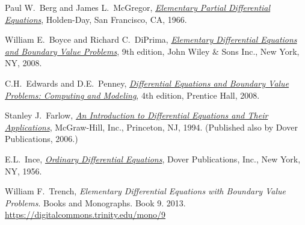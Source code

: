 \documentclass[12pt]{book}
\begin{document}
\begin{thebibliography}{MM}


\label{furtherreading:chapter}

 Paul W.\ Berg and James L.\ McGregor, 
 \emph{\href{https://books.google.com/books?id=EfJQAAAAMAAJ}{Elementary
Partial Differential Equations}}, 
 Holden-Day,
 San Francisco, CA,
 1966.

 William E.\ Boyce and
 Richard C.\ DiPrima,
 \emph{\href{https://books.google.com/books?id=nYWcQgAACAAJ}{Elementary
Differential Equations and Boundary Value Problems}},
 9th edition,
 John Wiley \& Sons Inc.,
 New York, NY, 2008.

 C.H.\ Edwards and D.E.\ Penney,
 \emph{\href{https://books.google.com/books?id=qi6ePwAACAAJ}{Differential
Equations and Boundary Value Problems: Computing and Modeling}},
 4th edition,
 Prentice Hall,
 2008.

 Stanley J.\ Farlow,
 \emph{\href{https://books.google.com/books?id=_ozWAAAAMAAJ}{An Introduction
to Differential Equations and Their Applications}},
 McGraw-Hill, Inc.,
 Princeton, NJ,
 1994.  (Published also by Dover Publications, 2006.)

 E.L.\ Ince,
 \emph{\href{https://books.google.com/books?id=uYz-pqUD75gC}{Ordinary
Differential Equations}},
 Dover Publications, Inc.,
 New York, NY,
 1956.

 William F.\ Trench,
 \emph{Elementary Differential Equations with Boundary Value
Problems}. Books and Monographs. Book 9.  2013.
\url{https://digitalcommons.trinity.edu/mono/9}

\end{thebibliography}
\end{document}
